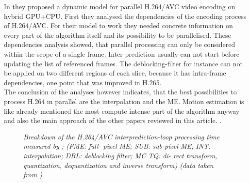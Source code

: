 In \cite{Paper2} they proposed a dynamic model for parallel H.264/AVC video encoding on hybrid GPU+CPU. 
First they analysed the dependencies of the encoding process of H.264/AVC. 
For their model to work they needed concrete information on every part of the algorithm itself and its possibility to be parallelised. 
These dependencies analysis showed, that parallel processing can only be considered within the scope of a single frame. 
Inter-prediction usually can not start before updating the list of referenced frames. 
The deblocking-filter for instance can not be applied on two different regions of each slice, because it has intra-frame dependencies, one point that was improved in H.265. \\
The conclusion of the analyses however indicates, that the best possibilities to process H.264 in parallel are the interpolation and the ME. 
Motion estimation is like already mentioned the most compute intense part of the algorithm anyway and also the main approach of the other papers reviewed in this article. 
.\\

\begin{figure}[H]

\caption{\label{dynamic_cpu_gpu}{\it Breakdown of the H.264/AVC interprediction-loop processing time measured by \cite{Paper2}; (FME: full-
pixel ME; SUB: sub-pixel ME; INT: interpolation; DBL: deblocking filter; MC TQ: di-
rect transform, quantization, dequantization and inverse transform) (data taken from \cite{Paper2})}}
\end{figure}

